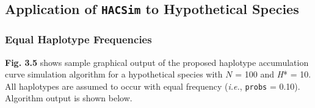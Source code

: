 \subsection{Application of {\tt HACSim} to Hypothetical Species}

\subsubsection{Equal Haplotype Frequencies}

\textbf{Fig. 3.5} shows sample graphical output of the proposed haplotype accumulation curve simulation algorithm for a hypothetical species with   $N$ = 100 and \textit{H}* = 10. All haplotypes are assumed to occur with equal frequency (\textit{i.e.}, {\tt probs} = 0.10). Algorithm output is shown below. 

\vspace{3mm}


